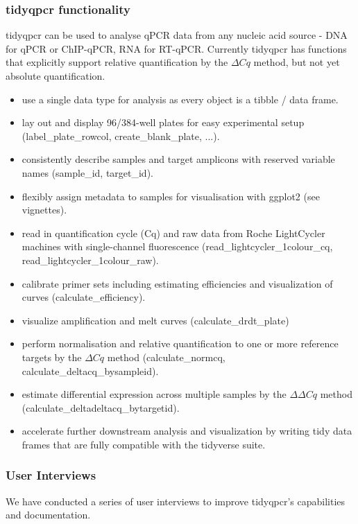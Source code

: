 \documentclass{SBCbookchapter}
\begin{document}
\subsubsection{tidyqpcr functionality}

tidyqpcr can be used to analyse qPCR data from any nucleic acid source - DNA for qPCR or ChIP-qPCR, RNA for RT-qPCR. Currently tidyqpcr has functions that explicitly support relative quantification by the $\Delta Cq$ method, but not yet absolute quantification.

\begin{itemize}
    \item use a single data type for analysis as every object is a tibble / data frame.
    \item lay out and display 96/384-well plates for easy experimental setup (label\_plate\_rowcol, create\_blank\_plate, ...).
    \item consistently describe samples and target amplicons with reserved variable names (sample\_id, target\_id).
    \item flexibly assign metadata to samples for visualisation with ggplot2 (see vignettes).
    \item read in quantification cycle (Cq) and raw data from Roche LightCycler machines with single-channel fluorescence (read\_lightcycler\_1colour\_cq, read\_lightcycler\_1colour\_raw).
    \item calibrate primer sets including estimating efficiencies and visualization of curves (calculate\_efficiency).
    \item visualize amplification and melt curves (calculate\_drdt\_plate)
    \item perform normalisation and relative quantification to one or more reference targets by the $\Delta Cq$ method (calculate\_normcq, calculate\_deltacq\_bysampleid).
    \item estimate differential expression across multiple samples by the $\Delta \Delta Cq$ method (calculate\_deltadeltacq\_bytargetid).
    \item accelerate further downstream analysis and visualization by writing tidy data frames that are fully compatible with the tidyverse suite.

\end{itemize}

\subsubsection{User Interviews}
We have conducted a series of user interviews to improve tidyqpcr's capabilities and documentation.
\end{document}
